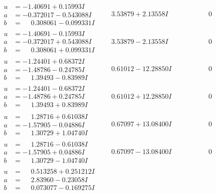 \documentclass[1p]{elsarticle_modified}
\theoremstyle{definition}
\begin{document}
$$\begin{array}{c|c|c}
\begin{aligned}
u &= -1.40691 + 0.15993 I \\
a &= -0.372017 - 0.543088 I \\
b &= \phantom{-}0.308061 - 0.099331 I\end{aligned}
 & \phantom{-}3.53879 + 2.13558 I & \phantom{-0.000000 } 0 \\ \hline\begin{aligned}
u &= -1.40691 - 0.15993 I \\
a &= -0.372017 + 0.543088 I \\
b &= \phantom{-}0.308061 + 0.099331 I\end{aligned}
 & \phantom{-}3.53879 - 2.13558 I & \phantom{-0.000000 } 0 \\ \hline\begin{aligned}
u &= -1.24401 + 0.68372 I \\
a &= -1.48786 - 0.24785 I \\
b &= \phantom{-}1.39493 - 0.83989 I\end{aligned}
 & \phantom{-}0.61012 - 12.28850 I & \phantom{-0.000000 } 0 \\ \hline\begin{aligned}
u &= -1.24401 - 0.68372 I \\
a &= -1.48786 + 0.24785 I \\
b &= \phantom{-}1.39493 + 0.83989 I\end{aligned}
 & \phantom{-}0.61012 + 12.28850 I & \phantom{-0.000000 } 0 \\ \hline\begin{aligned}
u &= \phantom{-}1.28716 + 0.61038 I \\
a &= -1.57905 - 0.04886 I \\
b &= \phantom{-}1.30729 + 1.04740 I\end{aligned}
 & \phantom{-}0.67097 + 13.08400 I & \phantom{-0.000000 } 0 \\ \hline\begin{aligned}
u &= \phantom{-}1.28716 - 0.61038 I \\
a &= -1.57905 + 0.04886 I \\
b &= \phantom{-}1.30729 - 1.04740 I\end{aligned}
 & \phantom{-}0.67097 - 13.08400 I & \phantom{-0.000000 } 0 \\ \hline\begin{aligned}
u &= \phantom{-}0.513258 + 0.251212 I \\
a &= \phantom{-}2.83960 - 0.23058 I \\
b &= \phantom{-}0.073077 - 0.169275 I\end{aligned}

\end{array}$$
\end{document}
